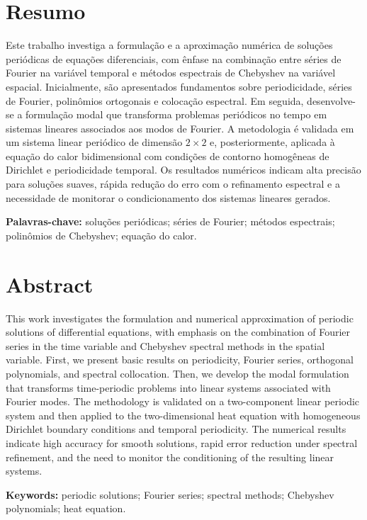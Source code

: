 \documentclass[12pt,a4paper]{report}
\begin{document}
\section*{Resumo}
Este trabalho investiga a formulação e a aproximação numérica de soluções periódicas de equações diferenciais, com ênfase na combinação entre séries de Fourier na variável temporal e métodos espectrais de Chebyshev na variável espacial. Inicialmente, são apresentados fundamentos sobre periodicidade, séries de Fourier, polinômios ortogonais e colocação espectral. Em seguida, desenvolve-se a formulação modal que transforma problemas periódicos no tempo em sistemas lineares associados aos modos de Fourier. A metodologia é validada em um sistema linear periódico de dimensão \(2\times2\) e, posteriormente, aplicada à equação do calor bidimensional com condições de contorno homogêneas de Dirichlet e periodicidade temporal. Os resultados numéricos indicam alta precisão para soluções suaves, rápida redução do erro com o refinamento espectral e a necessidade de monitorar o condicionamento dos sistemas lineares gerados.

\textbf{Palavras-chave:} soluções periódicas; séries de Fourier; métodos espectrais; polinômios de Chebyshev; equação do calor.

\section*{Abstract}
This work investigates the formulation and numerical approximation of periodic solutions of differential equations, with emphasis on the combination of Fourier series in the time variable and Chebyshev spectral methods in the spatial variable. First, we present basic results on periodicity, Fourier series, orthogonal polynomials, and spectral collocation. Then, we develop the modal formulation that transforms time-periodic problems into linear systems associated with Fourier modes. The methodology is validated on a two-component linear periodic system and then applied to the two-dimensional heat equation with homogeneous Dirichlet boundary conditions and temporal periodicity. The numerical results indicate high accuracy for smooth solutions, rapid error reduction under spectral refinement, and the need to monitor the conditioning of the resulting linear systems.

\textbf{Keywords:} periodic solutions; Fourier series; spectral methods; Chebyshev polynomials; heat equation.

\tableofcontents
\newpage






\appendix

\end{document}
